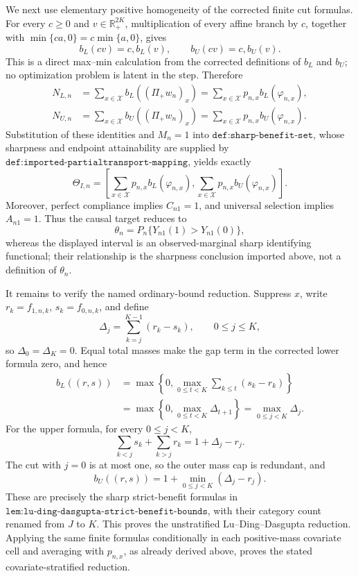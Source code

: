 We next use elementary positive homogeneity of the corrected finite cut formulas.  For every \(c\ge0\) and \(v\in\mathbb R_+^{2K}\), multiplication of every affine branch by \(c\), together with
\(\min\{ca,0\}=c\min\{a,0\}\), gives
\[
b_L(cv)=c,b_L(v),
\qquad
b_U(cv)=c,b_U(v).
\]
This is a direct max--min calculation from the corrected definitions of \(b_L\) and \(b_U\); no optimization problem is latent in the step.  Therefore
\[
\begin{aligned}
N_{L,n}
&=\sum_{x\in\mathcal X}b_L((\Pi_+w_n)_x)
=\sum_{x\in\mathcal X}p_{n,x}b_L(\varphi_{n,x}),\\
N_{U,n}
&=\sum_{x\in\mathcal X}b_U((\Pi_+w_n)_x)
=\sum_{x\in\mathcal X}p_{n,x}b_U(\varphi_{n,x}).
\end{aligned}
\]
Substitution of these identities and \(M_n=1\) into \(\texttt{def:sharp-benefit-set}\), whose sharpness and endpoint attainability are supplied by \(\texttt{def:imported-partialtransport-mapping}\), yields exactly
\[
\Theta_{I,n}
=\left[
\sum_{x\in\mathcal X}p_{n,x}b_L(\varphi_{n,x}),
\sum_{x\in\mathcal X}p_{n,x}b_U(\varphi_{n,x})
\right].
\]
Moreover, perfect compliance implies \(C_{n1}=1\), and universal selection implies \(A_{n1}=1\).  Thus the causal target reduces to
\[
\theta_n=P_n\{Y_{n1}(1)>Y_{n1}(0)\},
\]
whereas the displayed interval is an observed-marginal sharp identifying functional; their relationship is the sharpness conclusion imported above, not a definition of \(\theta_n\).

It remains to verify the named ordinary-bound reduction.  Suppress \(x\), write
\(r_k=f_{1,n,k}\), \(s_k=f_{0,n,k}\), and define
\[
\Delta_j=\sum_{k=j}^{K-1}(r_k-s_k),
\qquad 0\le j\le K,
\]
so \(\Delta_0=\Delta_K=0\).  Equal total masses make the gap term in the corrected lower formula zero, and hence
\[
\begin{aligned}
b_L((r,s))
&=\max\left\{0,\max_{0\le t<K}\sum_{k\le t}(s_k-r_k)\right\}\\
&=\max\left\{0,\max_{0\le t<K}\Delta_{t+1}\right\}
=\max_{0\le j<K}\Delta_j.
\end{aligned}
\]
For the upper formula, for every \(0\le j<K\),
\[
\sum_{k<j}s_k+\sum_{k>j}r_k
=1+\Delta_j-r_j.
\]
The cut with \(j=0\) is at most one, so the outer mass cap is redundant, and
\[
b_U((r,s))
=1+\min_{0\le j<K}(\Delta_j-r_j).
\]
These are precisely the sharp strict-benefit formulas in \(\texttt{lem:lu-ding-dasgupta-strict-benefit-bounds}\), with their category count renamed from \(J\) to \(K\).  This proves the unstratified Lu--Ding--Dasgupta reduction.  Applying the same finite formulas conditionally in each positive-mass covariate cell and averaging with \(p_{n,x}\), as already derived above, proves the stated covariate-stratified reduction.
